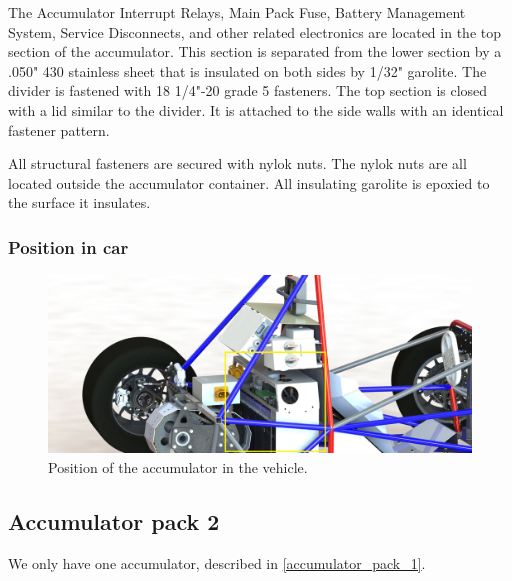 \documentclass{article}
\begin{document}
The Accumulator Interrupt Relays, Main Pack Fuse, Battery Management System, Service Disconnects, and other related electronics are located in the top section of the accumulator. This section is separated from the lower section by a .050" 430 stainless sheet that is insulated on both sides by 1/32" garolite. The divider is fastened with 18 1/4"-20 grade 5 fasteners. The top section is closed with a lid similar to the divider. It is attached to the side walls with an identical fastener pattern.

All structural fasteners are secured with nylok nuts. The nylok nuts are all located outside the accumulator container. All insulating garolite is epoxied to the surface it insulates.


\subsubsection{Position in car}

\begin{figure}[H]
	\centering  %
	
	\includegraphics[width=1\textwidth]{Accumulator_in_car_side}
	
	\caption{Position of the accumulator in the vehicle.}
	
	\label{fig:acc_in_frame}
\end{figure}

\subsection{Accumulator pack 2}\label{accumulator_pack_2}
We only have one accumulator, described in \ref{accumulator_pack_1}.
\end{document}
